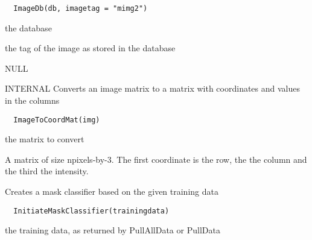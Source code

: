 \documentclass[a4paper]{book}
\begin{document}
%
\begin{Usage}
\begin{verbatim}
  ImageDb(db, imagetag = "mimg2")
\end{verbatim}
\end{Usage}
%
\begin{Arguments}
\begin{ldescription}
\item[\code{db}] the database

\item[\code{imagetag}] the tag of the image as stored in the
database
\end{ldescription}
\end{Arguments}
%
\begin{Value}
NULL
\end{Value}
%
\begin{Description}\relax
INTERNAL Converts an image matrix to a matrix with
coordinates and values in the columns
\end{Description}
%
\begin{Usage}
\begin{verbatim}
  ImageToCoordMat(img)
\end{verbatim}
\end{Usage}
%
\begin{Arguments}
\begin{ldescription}
\item[\code{img}] the matrix to convert
\end{ldescription}
\end{Arguments}
%
\begin{Value}
A matrix of size npixels-by-3. The first coordinate is
the row, the the column and the third the intensity.
\end{Value}
%
\begin{Description}\relax
Creates a mask classifier based on the given training
data
\end{Description}
%
\begin{Usage}
\begin{verbatim}
  InitiateMaskClassifier(trainingdata)
\end{verbatim}
\end{Usage}
%
\begin{Arguments}
\begin{ldescription}
\item[\code{trainingdata}] the training data, as returned by
PullAllData or PullData
\end{ldescription}
\end{Arguments}
\end{document}
